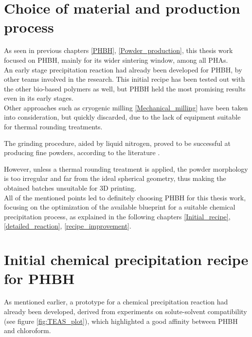 \documentclass{article}
\begin{document}
    \clearpage
    \section{Choice of material and production process\label{Choice_material_process}}

    As seen in previous chapters \ref{PHBH}, \ref{Powder_production}, this thesis work focused on PHBH, mainly for its wider sintering window, among all PHAs. \\ 

    An early stage precipitation reaction had already been developed for PHBH, by other teams involved in the research. 
    This initial recipe has been tested out with the other bio-based polymers as well, but PHBH held the most promising 
    results even in its early stages. \\ 

    Other approaches such as cryogenic milling \ref{Mechanical_milling} have been taken into consideration, but quickly 
    discarded, due to the lack of equipment suitable for thermal rounding treatments. 

    The grinding procedure, aided by liquid nitrogen, proved to be successful at producing fine powders, according to the literature \autocites{Dechet_Schmidt_thermal_rounding}. 

    However, unless a thermal rounding treatment is applied, the powder 
    morphology is too irregular and far from the ideal spherical geometry, thus making the 
    obtained batches unsuitable for 3D printing. \\  

    All of the mentioned points led to definitely choosing PHBH for this thesis work, focusing on the optimization of 
    the available blueprint for a suitable chemical 
    precipitation process, as explained in the following chapters \ref{Initial_recipe}, \ref{detailed_reaction}, \ref{recipe_improvement}. 

    \clearpage
    \section{Initial chemical precipitation recipe for PHBH\label{Initial_recipe}}
    
    As mentioned earlier, a prototype for a chemical precipitation reaction had already been developed, 
    derived from experiments on solute-solvent compatibility (see figure \ref{fig:TEAS_plot}), 
    which highlighted a good affinity between PHBH and chloroform. \\ 
\end{document}
